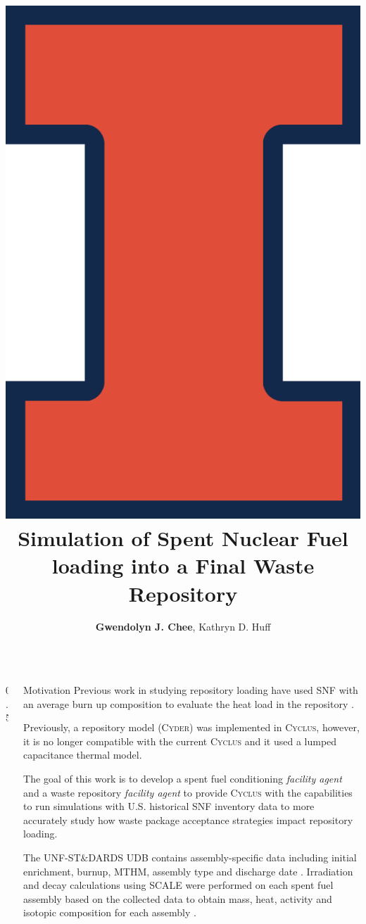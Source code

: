 \documentclass[final]{beamer}
\title{
	\includegraphics[width=0.3\linewidth]{UIUC_Logo}
	\vspace{2cm}
	\hspace{50cm}
	\vspace{1cm}
	Simulation of Spent Nuclear Fuel loading into a Final Waste Repository
} %
\author{\textbf{Gwendolyn J. Chee}, Kathryn D. Huff}
\institute{University of Illinios at Urbana-Champaign, Department of Nuclear, Plasma, and Radiological Engineering, Urbana, IL 61801}
\newlength{\sepwid}
\newlength{\onecolwid}
\newlength{\threecolwid}
\newcommand{\Cyclus}{\textsc{Cyclus}\xspace}%
\begin{document}

\setlength{\belowcaptionskip}{2ex} %
\setlength\belowdisplayshortskip{2ex} %

\begin{frame}[t] %

\begin{columns}[t,totalwidth=\threecolwid] %

\begin{column}{0.5\sepwid}\end{column} %

\begin{column}{\onecolwid} %


\begin{block}{Motivation}
Previous work in studying repository loading have used \gls{SNF} 
with an average burn up composition to evaluate the heat load in the repository 
\cite{greenberg_application_2012,johnson_optimizing_2016}.

Previously, a repository model (\textsc{Cyder}) was implemented in \Cyclus, however, 
it is no longer compatible with the current \Cyclus and it used a lumped capacitance 
thermal model. 

The goal of this work is to develop a spent fuel conditioning \textit{facility agent} 
and a waste repository \textit{facility agent} to provide \Cyclus with 
the capabilities to run simulations with U.S. historical SNF inventory data 
\cite{peterson_unf_standards_2017}
to more accurately study how waste package acceptance strategies impact repository loading. 

The UNF-ST$\&$DARDS \gls{UDB} contains assembly-specific data including initial enrichment, 
burnup, \gls{MTHM}, assembly type and discharge date \cite{peterson_fuel_2015}. 
Irradiation and decay calculations using SCALE \cite{bowman_scale_2011} were 
performed on each spent fuel assembly based on the collected data to obtain 
mass, heat, activity and isotopic composition for each assembly 
\cite{peterson_additional_2017}. 


\end{block}
\end{column}
\end{columns}
\end{frame}
\end{document}
